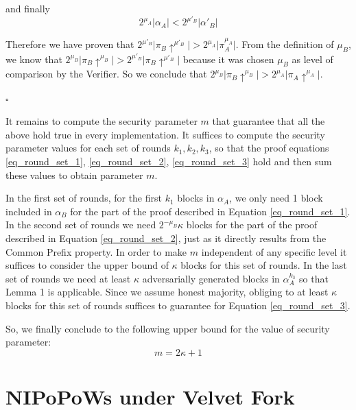 \documentclass[11pt,a4paper]{article}
\begin{document}
and finally 
\begin{equation}
2^{\mu_A} \vert \alpha_A \vert < 2^{\mu'_B} \vert \alpha'{_B} \vert
\end{equation}


Therefore we have proven that $2^{\mu'_B} \vert \pi_B \uparrow^{\mu'_B} \vert > 2^{\mu_A} \vert \pi_A^{\mu_A} \vert$. From the definition of $\mu_B$, we know that $2^{\mu_B} \vert \pi_B \uparrow^{\mu_B} \vert > 2^{\mu'_B} \vert \pi_B \uparrow^{\mu'_B} \vert$ because it was chosen $\mu_B$ as level of comparison by the Verifier. So we conclude that $2^{\mu_B} \vert \pi_B \uparrow^{\mu_B} \vert > 2^{\mu_A} \vert \pi_A \uparrow^{\mu_A} \vert$.

\begin{flushright}
$\square$
\end{flushright}

It remains to compute the security parameter $m$ that guarantee that all the above hold true in every implementation. It suffices to compute the security parameter values for each set of rounds $k_1, k_2, k_3$, so that the proof equations \ref{eq_round_set_1}, \ref{eq_round_set_2}, \ref{eq_round_set_3} hold and then sum these values to obtain parameter $m$.

In the first set of rounds, for the first $k_1$ blocks in $\alpha_A$, we only need 1 block included in $\alpha_B$ for the part of the proof described in Equation \ref{eq_round_set_1}. In the second set of rounds we need $2^{-\mu_B}\kappa$ blocks for the part of the proof described in Equation \ref{eq_round_set_2}, just as it directly results from the Common Prefix property. In order to make $m$ independent of any specific level it suffices to consider the upper bound of $\kappa$ blocks for this set of rounds. In the last set of rounds we need at least $\kappa$ adversarially generated blocks in $\alpha_A^{k_3}$ so that Lemma 1 is applicable. Since we assume honest majority, obliging to at least $\kappa$ blocks for this set of rounds suffices to guarantee for Equation \ref{eq_round_set_3}.

So, we finally conclude to the following upper bound for the value of security parameter:
\begin{equation}
m = 2\kappa + 1 
\end{equation}
 
\section{NIPoPoWs under Velvet Fork}
\end{document}
